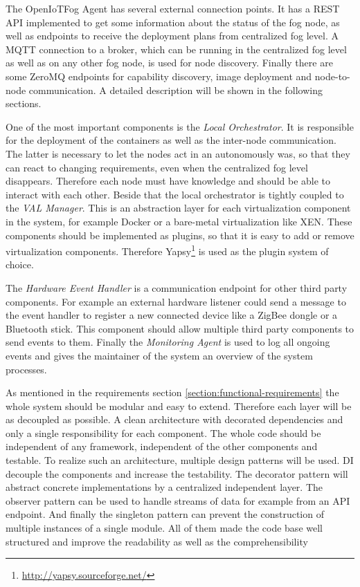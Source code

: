 The OpenIoTFog Agent has several external connection points.
It has a \ac{REST} \ac{API} implemented to get some information about the status of the fog node, as well as endpoints to receive the deployment plans from centralized fog level.
A \ac{MQTT} connection to a broker, which can be running in the centralized fog level as well as on any other fog node, is used for node discovery.
Finally there are some ZeroMQ endpoints for capability discovery, image deployment and node-to-node communication.
A detailed description will be shown in the following sections.

One of the most important components is the \textit{Local Orchestrator}.
It is responsible for the deployment of the containers as well as the inter-node communication.
The latter is necessary to let the nodes act in an autonomously was, so that they can react to changing requirements, even when the centralized fog level disappears.
Therefore each node must have knowledge and should be able to interact with each other.
Beside that the local orchestrator is tightly coupled to the \textit{\ac{VAL} Manager}.
This is an abstraction layer for each virtualization component in the system, for example Docker or a bare-metal virtualization like XEN.
These components should be implemented as plugins, so that it is easy to add or remove virtualization components.
Therefore Yapsy\footnote{\url{http://yapsy.sourceforge.net/}} is used as the plugin system of choice.

The \textit{Hardware Event Handler} is a communication endpoint for other third party components.
For example an external hardware listener could send a message to the event handler to register a new connected device like a ZigBee dongle or a Bluetooth stick.
This component should allow multiple third party components to send events to them.
Finally the \textit{Monitoring Agent} is used to log all ongoing events and gives the maintainer of the system an overview of the system processes.

As mentioned in the requirements section \ref{section:functional-requirements} the whole system should be modular and easy to extend.
Therefore each layer will be as decoupled as possible.
A clean architecture with decorated dependencies and only a single responsibility for each component.
The whole code should be independent of any framework, independent of the other components and testable.
To realize such an architecture, multiple design patterns will be used.
\ac{DI} decouple the components and increase the testability.
The decorator pattern will abstract concrete implementations by a centralized independent layer.
The observer pattern can be used to handle streams of data for example from an \ac{API} endpoint.
And finally the singleton pattern can prevent the construction of multiple instances of a single module.
All of them made the code base well structured and improve the readability as well as the comprehensibility



